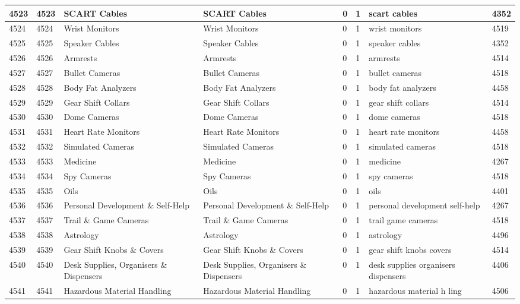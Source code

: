 \begin{longtable}{|l|l|l|l|l|l|l|l|}
4523 & 4523 & SCART Cables & SCART Cables & 0 & 1 & scart cables & 4352 \\ \hline 
4524 & 4524 & Wrist Monitors & Wrist Monitors & 0 & 1 & wrist monitors & 4519 \\ \hline 
4525 & 4525 & Speaker Cables & Speaker Cables & 0 & 1 & speaker cables & 4352 \\ \hline 
4526 & 4526 & Armrests & Armrests & 0 & 1 & armrests & 4514 \\ \hline 
4527 & 4527 & Bullet Cameras & Bullet Cameras & 0 & 1 & bullet cameras & 4518 \\ \hline 
4528 & 4528 & Body Fat Analyzers & Body Fat Analyzers & 0 & 1 & body fat analyzers & 4458 \\ \hline 
4529 & 4529 & Gear Shift Collars & Gear Shift Collars & 0 & 1 & gear shift collars & 4514 \\ \hline 
4530 & 4530 & Dome Cameras & Dome Cameras & 0 & 1 & dome cameras & 4518 \\ \hline 
4531 & 4531 & Heart Rate Monitors & Heart Rate Monitors & 0 & 1 & heart rate monitors & 4458 \\ \hline 
4532 & 4532 & Simulated Cameras & Simulated Cameras & 0 & 1 & simulated cameras & 4518 \\ \hline 
4533 & 4533 & Medicine & Medicine & 0 & 1 & medicine & 4267 \\ \hline 
4534 & 4534 & Spy Cameras & Spy Cameras & 0 & 1 & spy cameras & 4518 \\ \hline 
4535 & 4535 & Oils & Oils & 0 & 1 & oils & 4401 \\ \hline 
4536 & 4536 & Personal Development \& Self-Help & Personal Development \& Self-Help & 0 & 1 & personal development self-help & 4267 \\ \hline 
4537 & 4537 & Trail \& Game Cameras & Trail \& Game Cameras & 0 & 1 & trail game cameras & 4518 \\ \hline 
4538 & 4538 & Astrology & Astrology & 0 & 1 & astrology & 4496 \\ \hline 
4539 & 4539 & Gear Shift Knobs \& Covers & Gear Shift Knobs \& Covers & 0 & 1 & gear shift knobs covers & 4514 \\ \hline 
4540 & 4540 & Desk Supplies, Organisers \& Dispensers & Desk Supplies, Organisers \& Dispensers & 0 & 1 & desk supplies organisers dispensers & 4406 \\ \hline 
4541 & 4541 & Hazardous Material Handling & Hazardous Material Handling & 0 & 1 & hazardous material h ling & 4506 \\ \hline 

\end{longtable}
